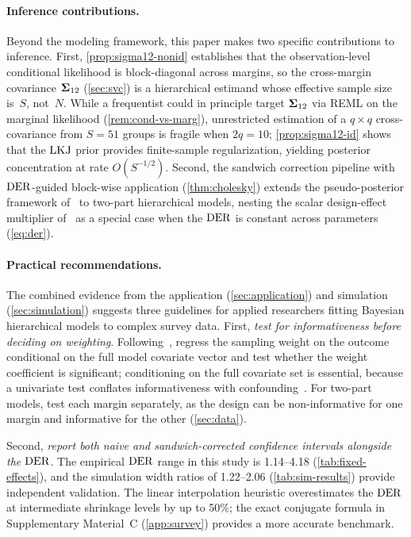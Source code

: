 \paragraph{Inference contributions.}
Beyond the modeling framework, this paper makes two specific
contributions to inference.  First,
\cref{prop:sigma12-nonid} establishes that the observation-level
conditional likelihood is block-diagonal across margins, so the
cross-margin covariance $\boldsymbol{\Sigma}_{12}$ (\cref{sec:svc}) is a
hierarchical estimand whose effective sample size is~$S$, not~$N$.
While a frequentist could in principle target $\boldsymbol{\Sigma}_{12}$ via REML
on the marginal likelihood (\cref{rem:cond-vs-marg}), unrestricted estimation of a
$q \times q$ cross-covariance from $S = 51$ groups is fragile when
$2q = 10$; \cref{prop:sigma12-id} shows that the $\operatorname{LKJ}$ prior provides
finite-sample regularization, yielding posterior concentration at rate
$O(S^{-1/2})$.
Second, the sandwich correction pipeline with $\operatorname{DER}$-guided block-wise
application (\cref{thm:cholesky}) extends the pseudo-posterior
framework of~\citet{WilliamsSavitsky2021} to two-part hierarchical
models, nesting the scalar design-effect multiplier
of~\citet{GhosalEtAl2020} as a special case when the $\operatorname{DER}$ is
constant across parameters (\cref{eq:der}).


\paragraph{Practical recommendations.}
The combined evidence from the application (\cref{sec:application})
and simulation (\cref{sec:simulation}) suggests three guidelines for
applied researchers fitting Bayesian hierarchical models to complex
survey data.
First, \emph{test for informativeness before deciding on weighting}.
Following~\citet{Pfeffermann1993}, regress the sampling weight on the
outcome conditional on the full model covariate vector and test whether
the weight coefficient is significant; conditioning on the full
covariate set is essential, because a univariate test conflates
informativeness with confounding~\citep{PfeffermannEtAl1998}. For
two-part models, test each margin separately, as the design can be
non-informative for one margin and informative for the other
(\cref{sec:data}).

Second, \emph{report both naive and sandwich-corrected confidence
intervals alongside the $\operatorname{DER}$}.
The empirical $\operatorname{DER}$ range in this study is 1.14--4.18
(\cref{tab:fixed-effects}), and the simulation width ratios of
1.22--2.06 (\cref{tab:sim-results}) provide independent validation.
The linear interpolation heuristic overestimates the $\operatorname{DER}$ at
intermediate shrinkage levels by up to 50\%; the exact conjugate
formula in Supplementary Material~C (\cref{app:survey}) provides a
more accurate benchmark.

